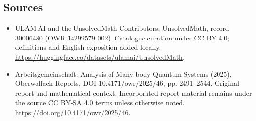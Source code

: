 \documentclass[11pt]{article}
\begin{document}
\subsection{Sources}
\begin{itemize}
\item[\hypertarget{source:30006480:1}{S1}] ULAM.AI and the UnsolvedMath Contributors, UnsolvedMath, record 30006480 (OWR-14299579-002). Catalogue curation under CC BY 4.0; definitions and English exposition added locally.
\url{https://huggingface.co/datasets/ulamai/UnsolvedMath}.
\item[\hypertarget{source:30006480:2}{S2}] Arbeitsgemeinschaft: Analysis of Many-body Quantum Systems (2025), Oberwolfach Reports, DOI 10.4171/owr/2025/46, pp. 2491--2544. Original report and mathematical context. Incorporated report material remains under the source CC BY-SA 4.0 terms unless otherwise noted.
\url{https://doi.org/10.4171/owr/2025/46}.
\end{itemize}
\label{end:30006480}
\end{document}
